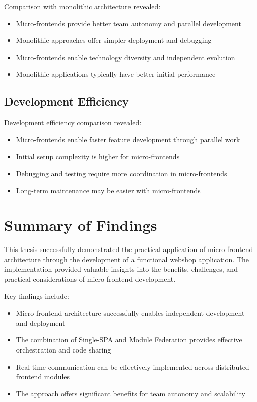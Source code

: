 \documentclass[12pt,a4paper]{report}
\begin{document}
Comparison with monolithic architecture revealed:
\begin{itemize}
    \item Micro-frontends provide better team autonomy and parallel development
    \item Monolithic approaches offer simpler deployment and debugging
    \item Micro-frontends enable technology diversity and independent evolution
    \item Monolithic applications typically have better initial performance
\end{itemize}

\subsection{Development Efficiency}

Development efficiency comparison revealed:
\begin{itemize}
    \item Micro-frontends enable faster feature development through parallel work
    \item Initial setup complexity is higher for micro-frontends
    \item Debugging and testing require more coordination in micro-frontends
    \item Long-term maintenance may be easier with micro-frontends
\end{itemize}

\section{Summary of Findings}

This thesis successfully demonstrated the practical application of micro-frontend architecture through the development of a functional webshop application. The implementation provided valuable insights into the benefits, challenges, and practical considerations of micro-frontend development.

Key findings include:
\begin{itemize}
    \item Micro-frontend architecture successfully enables independent development and deployment
    \item The combination of Single-SPA and Module Federation provides effective orchestration and code sharing
    \item Real-time communication can be effectively implemented across distributed frontend modules
    \item The approach offers significant benefits for team autonomy and scalability
\end{itemize}
\end{document}
